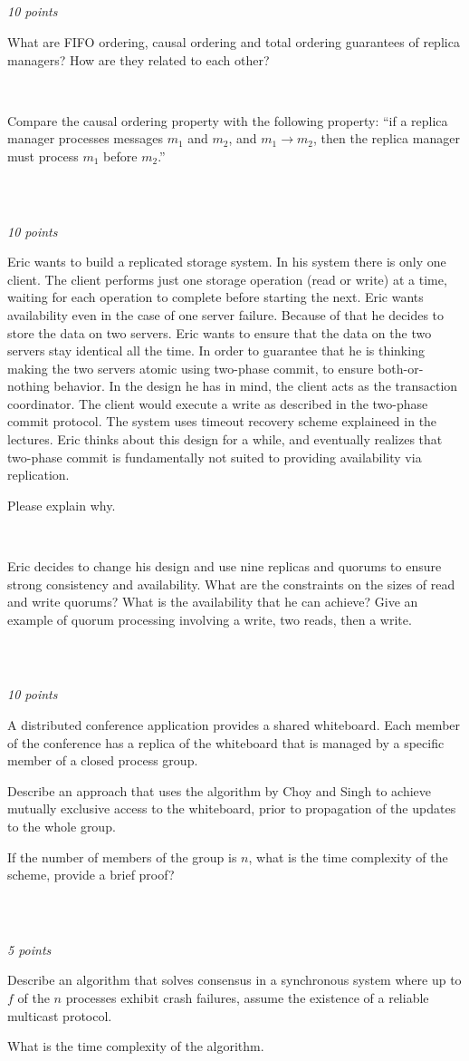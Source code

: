\documentclass[a4paper]{article}
\newcommand{\points}[1]{\subsection{} \textit{#1 points}\\}
\newcommand{\question}[2][]{
  \parbox[t]{\textwidth}{
    \ifthenelse{\equal{#1}{}}{}{#1)}
    \parbox[t]{0.95\textwidth}{#2}}\\}
\begin{document}
\points{10}
\question[a]{What are FIFO ordering, causal ordering and total
  ordering guarantees of replica managers? How are they related to
  each other?}
\question[b]{Compare the causal ordering property with the following
property: ``if a replica manager processes messages $m_1$ and $m_2$,
and $m_1 \rightarrow m_2$, then the replica manager must process $m_1$
before $m_2$.''}

\points{10}
\question[a]{Eric wants to build a replicated storage system. In his
  system there is only one client. The client performs just one
  storage operation (read or write) at a time, waiting for each
  operation to complete before starting the next. Eric wants
  availability even in the case of one server failure. Because of that
  he decides to store the data on two servers. Eric wants to ensure
  that the data on the two servers stay identical all the time. In
  order to guarantee that he is thinking making the two servers atomic
  using two-phase commit, to ensure both-or-nothing behavior. In the
  design he has in mind, the client acts as the transaction
  coordinator. The client would execute a write as described in the
  two-phase commit protocol. The system uses timeout recovery scheme
  explaineed in the lectures. Eric thinks about this design for a
  while, and eventually realizes that two-phase commit is
  fundamentally not suited to providing availability via
  replication.

  Please explain why.}
\question[b]{
  Eric decides to change his design and use nine replicas
  and quorums to ensure strong consistency and availability. What are
  the constraints on the sizes of read and write quorums? What is the
  availability that he can achieve? Give an example of quorum
  processing involving a write, two reads, then a write.
}

\points{10}
\question{
  A distributed conference application provides a shared
  whiteboard. Each member of the conference has a replica of the
  whiteboard that is managed by a specific member of a closed process
  group.

  Describe an approach that uses the algorithm by Choy and Singh to
  achieve mutually exclusive access to the whiteboard, prior to
  propagation of the updates to the whole group.

  If the number of members of the group is $n$, what is the time
  complexity of the scheme, provide a brief proof?
}

\points{5}
\question{
  Describe an algorithm that solves consensus in a synchronous
  system where up to $f$ of the $n$ processes exhibit crash failures,
  assume the existence of a reliable multicast protocol.

  What is the time complexity of the algorithm.
}
\end{document}

